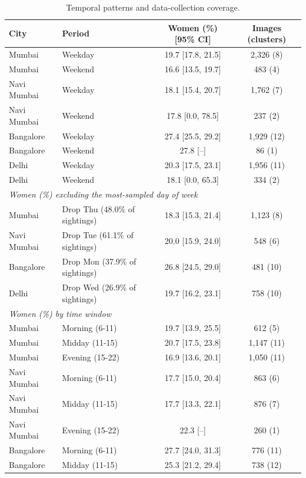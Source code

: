 \begin{table}[t]
\centering
\caption{Temporal patterns and data-collection coverage.}
\label{tab:temporal}
\scriptsize
\begin{threeparttable}
\begin{tabular}{@{\extracolsep{0pt}}llcc}
\toprule
City & Period & Women (\%) [95\% CI] & Images (clusters) \\
\midrule
Mumbai & Weekday & 19.7 [17.8, 21.5] & 2,326 (8) \\
Mumbai & Weekend & 16.6 [13.5, 19.7] & 483 (4) \\
Navi Mumbai & Weekday & 18.1 [15.4, 20.7] & 1,762 (7) \\
Navi Mumbai & Weekend & 17.8 [0.0, 78.5] & 237 (2) \\
Bangalore & Weekday & 27.4 [25.5, 29.2] & 1,929 (12) \\
Bangalore & Weekend & 27.8 [--] & 86 (1) \\
Delhi & Weekday & 20.3 [17.5, 23.1] & 1,956 (11) \\
Delhi & Weekend & 18.1 [0.0, 65.3] & 334 (2) \\
\midrule
\multicolumn{4}{l}{\textit{Women (\%) excluding the most-sampled day of week}} \\
\midrule
Mumbai & Drop Thu (48.0\% of sightings) & 18.3 [15.3, 21.4] & 1,123 (8) \\
Navi Mumbai & Drop Tue (61.1\% of sightings) & 20.0 [15.9, 24.0] & 548 (6) \\
Bangalore & Drop Mon (37.9\% of sightings) & 26.8 [24.5, 29.0] & 481 (10) \\
Delhi & Drop Wed (26.9\% of sightings) & 19.7 [16.2, 23.1] & 758 (10) \\
\midrule
\multicolumn{4}{l}{\textit{Women (\%) by time window}} \\
\midrule
Mumbai & Morning (6-11) & 19.7 [13.9, 25.5] & 612 (5) \\
Mumbai & Midday (11-15) & 20.7 [17.5, 23.8] & 1,147 (11) \\
Mumbai & Evening (15-22) & 16.9 [13.6, 20.1] & 1,050 (11) \\
Navi Mumbai & Morning (6-11) & 17.7 [15.0, 20.4] & 863 (6) \\
Navi Mumbai & Midday (11-15) & 17.7 [13.3, 22.1] & 876 (7) \\
Navi Mumbai & Evening (15-22) & 22.3 [--] & 260 (1) \\
Bangalore & Morning (6-11) & 27.7 [24.0, 31.3] & 776 (11) \\
Bangalore & Midday (11-15) & 25.3 [21.2, 29.4] & 738 (12) \\

\end{tabular}
\end{threeparttable}
\end{table}
